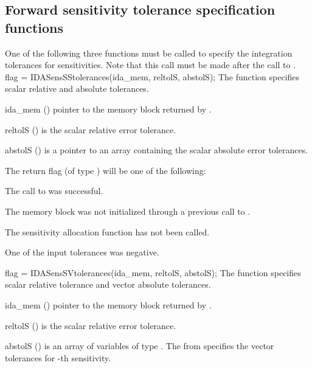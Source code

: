 \subsection{Forward sensitivity tolerance specification functions}
\label{sss:idafwdtolerances}
One of the following three functions must be called to specify the
integration tolerances for sensitivities. Note that this call must be made after 
the call to .
{
  flag = IDASensSStolerances(ida\_mem, reltolS, abstolS);
}
{
  The function  specifies scalar relative and absolute
  tolerances.
}
{
  \begin{args}
  \item[ida\_mem] ()
    pointer to the {\idas} memory block returned by .
  \item[reltolS] ()
    is the scalar relative error tolerance.
  \item[abstolS] ()
    is a pointer to an array containing the scalar absolute 
    error tolerances.
  \end{args}
}
{
  The return flag  (of type ) will be one of the following:
  \begin{args}
  \item[\Id{IDA\_SUCCESS}]
    The call to  was successful.
  \item[\Id{IDA\_MEM\_NULL}] 
    The {\idas} memory block was not initialized through a previous call to
    .
  \item[\Id{IDA\_NO\_SENS}] 
    The sensitivity allocation function  has not been called.
  \item[\Id{IDA\_ILL\_INPUT}] 
    One of the input tolerances was negative.
  \end{args}
}
{}
{
  flag = IDASensSVtolerances(ida\_mem, reltolS, abstolS);
}
{
  The function  specifies scalar relative tolerance and
  vector absolute tolerances.
}
{
  \begin{args}
  \item[ida\_mem] ()
    pointer to the {\idas} memory block returned by .
  \item[reltolS] ()
    is the scalar relative error tolerance.
  \item[abstolS] ()
    is an array of  variables of type . The  from
     specifies the vector tolerances for -th sensitivity.
  \end{args}
}
